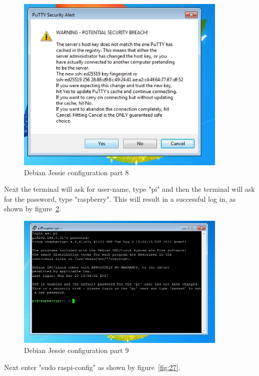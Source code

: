 \documentclass[12pt,]{article}
\begin{document}
\begin{figure}[H]
  	\begin{center}
    	\includegraphics[width=0.9\textwidth]{Ras_7}
  	\end{center}
  	\caption{Debian Jessie configuration part 8}
	\label{fig:25}
\end{figure}
Next the terminal will ask for user-name, type "pi" and then the terminal will ask for the password, type "raspberry". This will result in a successful log in, as shown by figure~\ref{fig:26}.
\begin{figure}[H]
  	\begin{center}
    	\includegraphics[width=0.9\textwidth]{Ras_8}
  	\end{center}
  	\caption{Debian Jessie configuration part 9}
	\label{fig:26}
\end{figure}
Next enter "sudo raspi-config" as shown by figure~\ref{fig:27}.
\end{document}
